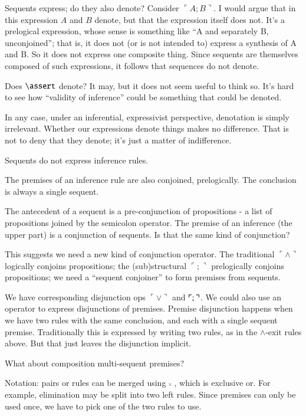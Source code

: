 \documentclass{article}
\begin{document}
Sequents express; do they also denote? Consider \(\ulcorner
A;B\urcorner\). I would argue that in this expression \(A\) and \(B\)
denote, but that the expression itself does not. It's a prelogical
expression, whose sense is something like ``A and separately B,
unconjoined''; that is, it does not (or is not intended to) express a
synthesis of A and B. So it does not express one composite thing.
Since sequents are themselves composed of such expressions, it follows
that sequences do not denote.

Does \(\linfer\) denote? It may, but it does not seem useful to think
so. It's hard to see how ``validity of inference'' could be something
that could be denoted.

In any case, under an inferential, expressivist perspective,
denotation is simply irrelevant. Whether our expressions denote things
makes no difference. That is not to deny that they denote; it's just a
matter of indifference.

Sequents do not express inference rules.

The premises of an inference rule are also conjoined, prelogically.
The conclusion is always a single sequent.

The antecedent of a sequent is a pre-conjunction of propositions - a
list of propositions joined by the semicolon operator. The premise of
an inference (the upper part) is a conjunction of sequents. Is that
the same kind of conjunction?

This suggests we need a new kind of conjunction operator. The
traditional \(\ulcorner\land\urcorner\) logically conjoins propositions; the
(sub)structural \(\ulcorner ;\urcorner\) prelogically conjoins propositions; we need a
``sequent conjoiner'' to form premises from sequents.

We have corresponding disjunction ops \(\ulcorner\lor\urcorner\) and
\(\ulcorner\structor\urcorner\). We could also use an operator to
express disjunctions of premises. Premise disjunction happens when we
have two rules with the same conclusion, and each with a single
sequent premise. Traditionally this is expressed by writing two rules, as in the \(\land\text{-exit}\) rules above.
But that just leaves the disjunction implicit.

What about composition multi-sequent premises?

Notation: pairs or rules can be merged using \(\scriptscriptstyle\veebar\ \), which is
exclusive or. For example, elimination may be split into two left
rules. Since premises can only be used once, we have to pick one of
the two rules to use.
\end{document}

